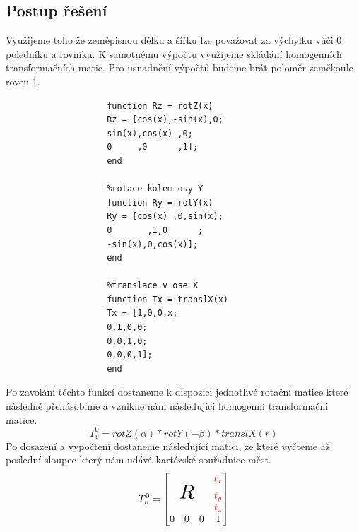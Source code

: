 \documentclass{article}
\begin{document}
		\subsection{Postup řešení}
			Využijeme toho že zeměpisnou délku a šířku lze považovat za výchylku vůči 0 poledníku a rovníku. K samotnému výpočtu využijeme skládání homogenních transformačních matic. Pro usnadnění výpočtů budeme brát poloměr zeměkoule roven 1.  
				\begin{lstlisting}[caption={Použité funkce v MATLABu},label={lst:sql}]
					%rotace kolem osy Z
					function Rz = rotZ(x)
					Rz = [cos(x),-sin(x),0;
					sin(x),cos(x) ,0;
					0     ,0      ,1];
					end
					
					%rotace kolem osy Y
					function Ry = rotY(x)
					Ry = [cos(x) ,0,sin(x);
					0       ,1,0      ;
					-sin(x),0,cos(x)];
					end
					
					%translace v ose X
					function Tx = translX(x)
					Tx = [1,0,0,x;
					0,1,0,0;
					0,0,1,0;
					0,0,0,1];
					end
				\end{lstlisting}
			Po zavolání těchto funkcí dostaneme k dispozici jednotlivé rotační matice které následně přenásobíme a vznikne nám následující homogenní transformační matice. 
				\begin{equation*}
					T_v^0 = rotZ(\alpha) * rotY(-\beta) *translX(r)
				\end{equation*}
			Po dosazení a vypočtení dostaneme následující matici, ze které vyčteme až poslední sloupec který nám udává kartézské souřadnice měst.
				\begin{align}
					T^0_v &= \begin{bmatrix}
						\multicolumn{3}{c}{} & \color{red} t_x \\
						\multicolumn{3}{c}{\scaleobj{2}{R}} & \color{red} t_y \\ 
						\multicolumn{3}{c}{} & \color{red} t_z \\
						0 & 0 & 0 & 1 \\
					\end{bmatrix} \label{eq:trans_mat_final} \\   
				\end{align}
			\newpage
\end{document}
